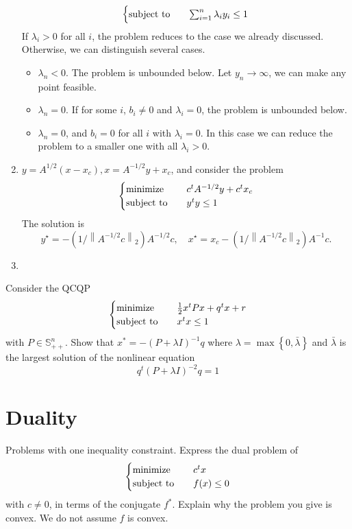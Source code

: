 \begin{problem}[4.21]
\begin{enumerate}
\[\begin{cases}
            \operatorname{subject\ to}\quad &\sum_{i = 1}^n\lambda_iy_i \le 1
        \end{cases}\]If $\lambda_i > 0$ for all $i$, the problem reduces to the case we already discussed. Otherwise, we can distinguish several cases.\begin{itemize}
            \item $\lambda_n < 0$. The problem is unbounded below. Let $y_n \to \infty$, we can make any point feasible.
            \item $\lambda_n = 0$. If for some $i$, $b_i \neq 0$ and $\lambda_i = 0$, the problem is unbounded below.
            \item $\lambda_n = 0$, and $b_i = 0$ for all $i$ with $\lambda_i = 0$. In this case we can reduce the problem to a smaller one with all $\lambda_i > 0$. 
        \end{itemize}
        \item $y = A^{1 / 2}(x - x_c), x = A^{-1 / 2}y + x_c$, and consider the problem\[\begin{cases}
            \operatorname{minimize} \quad &c^tA^{-1 / 2}y + c^tx_c\\
            \operatorname{subject\ to}\quad &y^ty \le 1
        \end{cases}\] The solution is \[y^{\star}=-\left(1 /\left\|A^{-1 / 2} c\right\|_{2}\right) A^{-1 / 2} c, \quad x^{\star}=x_{c}-\left(1 /\left\|A^{-1 / 2} c\right\|_{2}\right) A^{-1} c .\]
        \item 
    \end{enumerate}
\end{problem}

\begin{problem}[4.22]
    Consider the QCQP\[\begin{cases}
        \operatorname{minimize} \quad &\frac{1}{2} x^tPx + q^tx + r\\
        \operatorname{subject\ to} \quad &x^tx \le 1
    \end{cases}\]
    with $P \in \mathbb{S}_{++}^n$. Show that $x^* = -(P + \lambda I)^{-1}q$ where $\lambda = \max\left\{0, \bar{\lambda}\right\}$ and $\bar{\lambda}$ is the largest solution of the nonlinear equation \[q^t(P + \lambda I)^{-2}q = 1\]
\end{problem}

\section{Duality}
\begin{problem}[5.3]
    Problems with one inequality constraint. Express the dual problem of\[\begin{cases}
        \operatorname{minimize} \quad &c^tx \\
        \operatorname{subject\ to} \quad &f(x) \le 0
    \end{cases}\] with $c \neq 0$, in terms of the conjugate $f^*$. Explain why the problem you give is convex. We do not assume $f$ is convex.
\end{problem}


